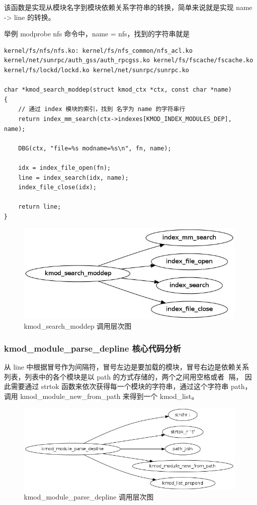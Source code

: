 该函数是实现从模块名字到模块依赖关系字符串的转换，简单来说就是实现 name
-\textgreater{} line 的转换。

举例 modprobe nfs 命令中，name = nfs，找到的字符串就是

{\begin{shaded}\begin{verbatim}
kernel/fs/nfs/nfs.ko: kernel/fs/nfs_common/nfs_acl.ko kernel/net/sunrpc/auth_gss/auth_rpcgss.ko kernel/fs/fscache/fscache.ko kernel/fs/lockd/lockd.ko kernel/net/sunrpc/sunrpc.ko

char *kmod_search_moddep(struct kmod_ctx *ctx, const char *name)
{
    // 通过 index 模块的索引，找到 名字为 name 的字符串行
    return index_mm_search(ctx->indexes[KMOD_INDEX_MODULES_DEP], name);

    DBG(ctx, "file=%s modname=%s\n", fn, name);

    idx = index_file_open(fn);
    line = index_search(idx, name);
    index_file_close(idx);

    return line;
}
\end{verbatim}\end{shaded}}
\begin{figure}[htbp]
\centering
\includegraphics{./figures/kmod_search_moddep.jpg}
\caption{kmod\_search\_moddep 调用层次图}
\end{figure}

\subsubsection{kmod\_module\_parse\_depline 核心代码分析}

从 line
中根据冒号作为间隔符，冒号左边是要加载的模块，冒号右边是依赖关系列表，列表中的各个模块是以
path 的方式存储的，两个之间用空格或者 \t 间隔， 因此需要通过 strtok
函数来依次获得每一个模块的字符串，通过这个字符串 path，调用
kmod\_module\_new\_from\_path 来得到一个 kmod\_list。

\begin{figure}[htbp]
\centering
\includegraphics{./figures/kmod_module_parse_depline.jpg}
\caption{kmod\_module\_parse\_depline 调用层次图}
\end{figure}

